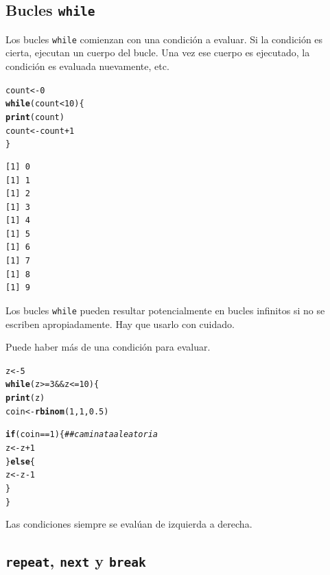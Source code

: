 \documentclass{article}\usepackage[]{graphicx}\usepackage[]{color}
\makeatletter
\newcommand{\hlnum}[1]{\textcolor[rgb]{0.686,0.059,0.569}{#1}}%
\newcommand{\hlcom}[1]{\textcolor[rgb]{0.678,0.584,0.686}{\textit{#1}}}%
\newcommand{\hlopt}[1]{\textcolor[rgb]{0,0,0}{#1}}%
\newcommand{\hlstd}[1]{\textcolor[rgb]{0.345,0.345,0.345}{#1}}%
\newcommand{\hlkwa}[1]{\textcolor[rgb]{0.161,0.373,0.58}{\textbf{#1}}}%
\newcommand{\hlkwb}[1]{\textcolor[rgb]{0.69,0.353,0.396}{#1}}%
\newcommand{\hlkwd}[1]{\textcolor[rgb]{0.737,0.353,0.396}{\textbf{#1}}}%
\newenvironment{kframe}{%
 \def\at@end@of@kframe{}%
 \ifinner\ifhmode%
  \def\at@end@of@kframe{\end{minipage}}%
  \begin{minipage}{\columnwidth}%
 \fi\fi%
 \def\FrameCommand##1{\hskip\@totalleftmargin \hskip-\fboxsep
 \colorbox{shadecolor}{##1}\hskip-\fboxsep
     \hskip-\linewidth \hskip-\@totalleftmargin \hskip\columnwidth}%
 \MakeFramed {\advance\hsize-\width
   \@totalleftmargin\z@ \linewidth\hsize
   \@setminipage}}%
 {\par\unskip\endMakeFramed%
 \at@end@of@kframe}
\newenvironment{knitrout}{}{} %
\makeatother
\begin{document}
  \subsection{Bucles \texttt{while}}
  Los bucles \texttt{while} comienzan con una condición a evaluar. Si la condición es cierta, ejecutan un cuerpo del bucle. Una vez ese cuerpo es ejecutado, la condición es evaluada nuevamente, etc.
\begin{knitrout}
\color{fgcolor}\begin{kframe}
\begin{alltt}
  \hlstd{count} \hlkwb{<-} \hlnum{0}
  \hlkwa{while}\hlstd{(count} \hlopt{<} \hlnum{10}\hlstd{)\{}
    \hlkwd{print}\hlstd{(count)}
    \hlstd{count} \hlkwb{<-} \hlstd{count} \hlopt{+} \hlnum{1}
  \hlstd{\}}
\end{alltt}
\begin{verbatim}
[1] 0
[1] 1
[1] 2
[1] 3
[1] 4
[1] 5
[1] 6
[1] 7
[1] 8
[1] 9
\end{verbatim}
\end{kframe}
\end{knitrout}
Los bucles \texttt{while} pueden resultar potencialmente en bucles infinitos si no se escriben apropiadamente. Hay que usarlo con cuidado.

Puede haber más de una condición para evaluar.
\begin{knitrout}
\color{fgcolor}\begin{kframe}
\begin{alltt}
  \hlstd{z} \hlkwb{<-} \hlnum{5}
  \hlkwa{while}\hlstd{(z} \hlopt{>=} \hlnum{3} \hlopt{&&} \hlstd{z} \hlopt{<=} \hlnum{10}\hlstd{)\{}
    \hlkwd{print}\hlstd{(z)}
    \hlstd{coin} \hlkwb{<-} \hlkwd{rbinom}\hlstd{(}\hlnum{1}\hlstd{,} \hlnum{1}\hlstd{,} \hlnum{0.5}\hlstd{)}

    \hlkwa{if}\hlstd{(coin} \hlopt{==} \hlnum{1}\hlstd{) \{} \hlcom{## caminata aleatoria}
      \hlstd{z} \hlkwb{<-} \hlstd{z} \hlopt{+} \hlnum{1}
    \hlstd{\}} \hlkwa{else} \hlstd{\{}
      \hlstd{z} \hlkwb{<-} \hlstd{z} \hlopt{-} \hlnum{1}
    \hlstd{\}}
  \hlstd{\}}
\end{alltt}
\end{kframe}
\end{knitrout}
  Las condiciones siempre se evalúan de izquierda a derecha.
  
  \subsection{\texttt{repeat}, \texttt{next} y \texttt{break}}
\end{document}
